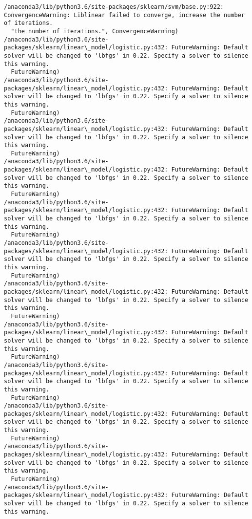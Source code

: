 \documentclass[11pt]{article}
\begin{document}
\begin{Verbatim}[commandchars=\\\{\}]
/anaconda3/lib/python3.6/site-packages/sklearn/svm/base.py:922: ConvergenceWarning: Liblinear failed to converge, increase the number of iterations.
  "the number of iterations.", ConvergenceWarning)
/anaconda3/lib/python3.6/site-packages/sklearn/linear\_model/logistic.py:432: FutureWarning: Default solver will be changed to 'lbfgs' in 0.22. Specify a solver to silence this warning.
  FutureWarning)
/anaconda3/lib/python3.6/site-packages/sklearn/linear\_model/logistic.py:432: FutureWarning: Default solver will be changed to 'lbfgs' in 0.22. Specify a solver to silence this warning.
  FutureWarning)
/anaconda3/lib/python3.6/site-packages/sklearn/linear\_model/logistic.py:432: FutureWarning: Default solver will be changed to 'lbfgs' in 0.22. Specify a solver to silence this warning.
  FutureWarning)
/anaconda3/lib/python3.6/site-packages/sklearn/linear\_model/logistic.py:432: FutureWarning: Default solver will be changed to 'lbfgs' in 0.22. Specify a solver to silence this warning.
  FutureWarning)
/anaconda3/lib/python3.6/site-packages/sklearn/linear\_model/logistic.py:432: FutureWarning: Default solver will be changed to 'lbfgs' in 0.22. Specify a solver to silence this warning.
  FutureWarning)
/anaconda3/lib/python3.6/site-packages/sklearn/linear\_model/logistic.py:432: FutureWarning: Default solver will be changed to 'lbfgs' in 0.22. Specify a solver to silence this warning.
  FutureWarning)
/anaconda3/lib/python3.6/site-packages/sklearn/linear\_model/logistic.py:432: FutureWarning: Default solver will be changed to 'lbfgs' in 0.22. Specify a solver to silence this warning.
  FutureWarning)
/anaconda3/lib/python3.6/site-packages/sklearn/linear\_model/logistic.py:432: FutureWarning: Default solver will be changed to 'lbfgs' in 0.22. Specify a solver to silence this warning.
  FutureWarning)
/anaconda3/lib/python3.6/site-packages/sklearn/linear\_model/logistic.py:432: FutureWarning: Default solver will be changed to 'lbfgs' in 0.22. Specify a solver to silence this warning.
  FutureWarning)
/anaconda3/lib/python3.6/site-packages/sklearn/linear\_model/logistic.py:432: FutureWarning: Default solver will be changed to 'lbfgs' in 0.22. Specify a solver to silence this warning.
  FutureWarning)
/anaconda3/lib/python3.6/site-packages/sklearn/linear\_model/logistic.py:432: FutureWarning: Default solver will be changed to 'lbfgs' in 0.22. Specify a solver to silence this warning.
  FutureWarning)
/anaconda3/lib/python3.6/site-packages/sklearn/linear\_model/logistic.py:432: FutureWarning: Default solver will be changed to 'lbfgs' in 0.22. Specify a solver to silence this warning.

\end{Verbatim}
\end{document}
